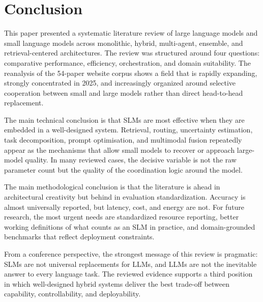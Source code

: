 \section{Conclusion}
This paper presented a systematic literature review of large language models and small language models across monolithic, hybrid, multi-agent, ensemble, and retrieval-centered architectures. The review was structured around four questions: comparative performance, efficiency, orchestration, and domain suitability. The reanalysis of the 54-paper website corpus shows a field that is rapidly expanding, strongly concentrated in 2025, and increasingly organized around selective cooperation between small and large models rather than direct head-to-head replacement.

The main technical conclusion is that SLMs are most effective when they are embedded in a well-designed system. Retrieval, routing, uncertainty estimation, task decomposition, prompt optimisation, and multimodal fusion repeatedly appear as the mechanisms that allow small models to recover or approach large-model quality. In many reviewed cases, the decisive variable is not the raw parameter count but the quality of the coordination logic around the model.

The main methodological conclusion is that the literature is ahead in architectural creativity but behind in evaluation standardization. Accuracy is almost universally reported, but latency, cost, and energy are not. For future research, the most urgent needs are standardized resource reporting, better working definitions of what counts as an SLM in practice, and domain-grounded benchmarks that reflect deployment constraints.

From a conference perspective, the strongest message of this review is pragmatic: SLMs are not universal replacements for LLMs, and LLMs are not the inevitable answer to every language task. The reviewed evidence supports a third position in which well-designed hybrid systems deliver the best trade-off between capability, controllability, and deployability.
